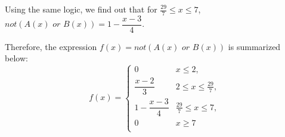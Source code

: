Using the same logic, we find out that for $\frac{29}{7} \le x \le 7$, $\textit{not}\left(A(x) \textit{ or } B(x)\right) = 1 - \dfrac{x-3}{4}$. 

Therefore, the expression $f(x) = \textit{not}\left(A(x) \textit{ or } B(x)\right)$ is summarized below:
\begin{equation}
	f(x) = \left\{
	\begin{array}{cc}
		0 & x \le 2, \\[4mm]
		\dfrac{x-2}{3} & 2 \le x \le \frac{29}{7}, \\[4mm]
		1 - \dfrac{x-3}{4} & \frac{29}{7} \le x \le 7, \\[4mm]
		0 & x \ge 7\\
	\end{array}
	\right.
\end{equation}